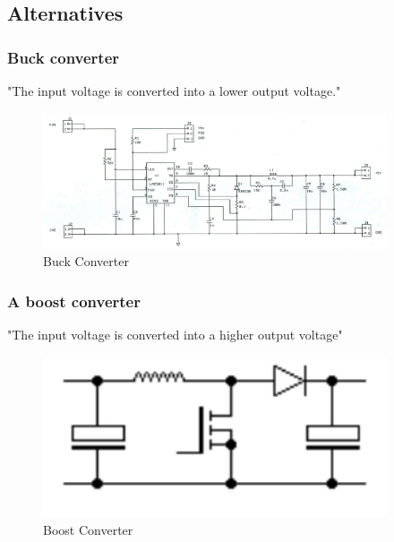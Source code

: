 \subsection{Alternatives}
\subsubsection{Buck converter}
 "The input voltage is converted into a lower output voltage."\cite{SMPSD}
\begin{figure}[h]
\begin{center}
\includegraphics[width=4in]{includes/Buck}
\caption{Buck Converter}
\label{fig:1}
\end{center}
\end{figure}


\subsubsection{A boost converter} "The input voltage is converted into a higher output voltage"\cite{SMPSD}
\begin{figure}[H]
\begin{center}
\includegraphics[width=4in]{includes/Boost}
\caption{Boost Converter}
\label{fig:1}
\end{center}
\end{figure}

